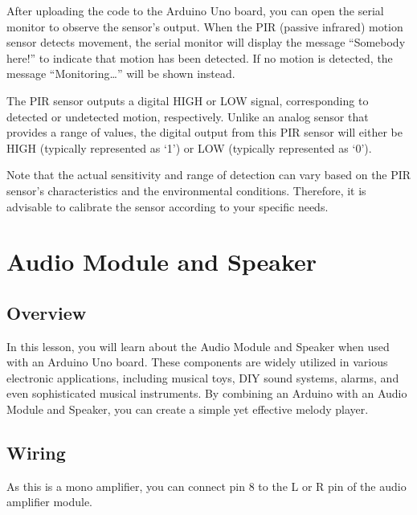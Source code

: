 \documentclass[a4paper,11pt,english]{sphinxmanual}
\begin{document}
\sphinxAtStartPar
After uploading the code to the Arduino Uno board, you can open the serial monitor to observe the sensor’s output. When the PIR (passive infrared) motion sensor detects movement, the serial monitor will display the message “Somebody here!” to indicate that motion has been detected. If no motion is detected, the message “Monitoring…” will be shown instead.

\sphinxAtStartPar
The PIR sensor outputs a digital HIGH or LOW signal, corresponding to detected or undetected motion, respectively. Unlike an analog sensor that provides a range of values, the digital output from this PIR sensor will either be HIGH (typically represented as ‘1’) or LOW (typically represented as ‘0’).

\sphinxAtStartPar
Note that the actual sensitivity and range of detection can vary based on the PIR sensor’s characteristics and the environmental conditions. Therefore, it is advisable to calibrate the sensor according to your specific needs.

\sphinxstepscope


\section{Audio Module and Speaker}
\label{\detokenize{Basic_Project/Audio_Module_Speaker:audio-module-and-speaker}}\label{\detokenize{Basic_Project/Audio_Module_Speaker:basic-audio-module-speaker}}\label{\detokenize{Basic_Project/Audio_Module_Speaker::doc}}

\subsection{Overview}
\label{\detokenize{Basic_Project/Audio_Module_Speaker:overview}}
\sphinxAtStartPar
In this lesson, you will learn about the Audio Module and Speaker when used with an Arduino Uno board. These components are widely utilized in various electronic applications, including musical toys, DIY sound systems, alarms, and even sophisticated musical instruments. By combining an Arduino with an Audio Module and Speaker, you can create a simple yet effective melody player.


\subsection{Wiring}
\label{\detokenize{Basic_Project/Audio_Module_Speaker:wiring}}
\sphinxAtStartPar
As this is a mono amplifier, you can connect pin 8 to the L or R pin of the audio amplifier module.
\end{document}
